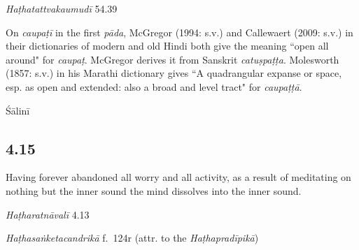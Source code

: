 \begin{ekdosis}
\begin{testimonia}[hp04_014]
\emph{Haṭhatattvakaumudī}  54.39
\begin{versinnote}
\end{versinnote}

\end{testimonia}

\begin{philcomm}[hp04_014]
On \emph{caupaṭī} in the first \emph{pāda}, McGregor (1994: s.v.) and Callewaert (2009: s.v.) in their dictionaries of modern and old Hindi both give the meaning ``open all around" for \emph{caupaṭ}. McGregor derives it from Sanskrit \emph{catuṣpaṭṭa}. Molesworth (1857: s.v.) in his Marathi dictionary gives ``A quadrangular expanse or space, esp. as open and extended: also a broad and level tract" for \emph{caupaṭṭā}.
\end{philcomm}

\begin{metre}[hp04_014]
Śālinī 
\end{metre}

\subsection*{4.15}
\begin{translation}[hp04_015]
Having forever abandoned all worry and all activity, as a result of meditating on nothing but the inner sound the mind dissolves into the inner sound.
\end{translation}


\begin{testimonia}[hp04_015]
\emph{Haṭharatnāvalī} 4.13
\begin{versinnote}
\end{versinnote}

\emph{Haṭhasaṅketacandrikā} f.~124r (attr. to the \emph{Haṭhapradīpikā})
\begin{versinnote}
\end{versinnote}


\end{testimonia}
\end{ekdosis}
